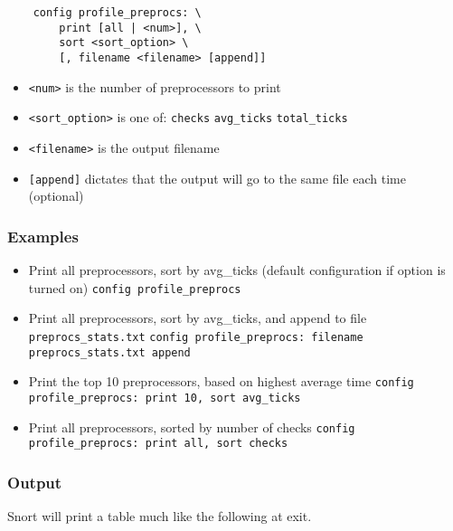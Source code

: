 \documentclass[english]{report}
\begin{document}
\begin{verbatim}
    config profile_preprocs: \
        print [all | <num>], \
        sort <sort_option> \
        [, filename <filename> [append]]
\end{verbatim}

\begin{itemize}
\item \texttt{<num>} is the number of preprocessors to print
\item \texttt{<sort\_option>} is one of:
\subitem \texttt{checks}
\subitem \texttt{avg\_ticks}
\subitem \texttt{total\_ticks}
\item \texttt{<filename>} is the output filename
\item \texttt{[append]} dictates that the output will go to the same file each time (optional)
\end{itemize}

\subsubsection{Examples}

\begin{itemize}

\item Print all preprocessors, sort by avg\_ticks (default configuration if
option is turned on)
\subitem \texttt{config profile\_preprocs}

\item Print all preprocessors, sort by avg\_ticks, and append to file
\texttt{preprocs\_stats.txt} 
\subitem \texttt{config profile\_preprocs: filename \texttt{preprocs\_stats.txt} append}

\item Print the top 10 preprocessors, based on highest average time
\subitem \texttt{config profile\_preprocs: print 10, sort avg\_ticks}

\item Print all preprocessors, sorted by number of checks
\subitem \texttt{config profile\_preprocs: print all, sort checks}

\end{itemize}

\subsubsection{Output}

Snort will print a table much like the following at exit.
\end{document}

